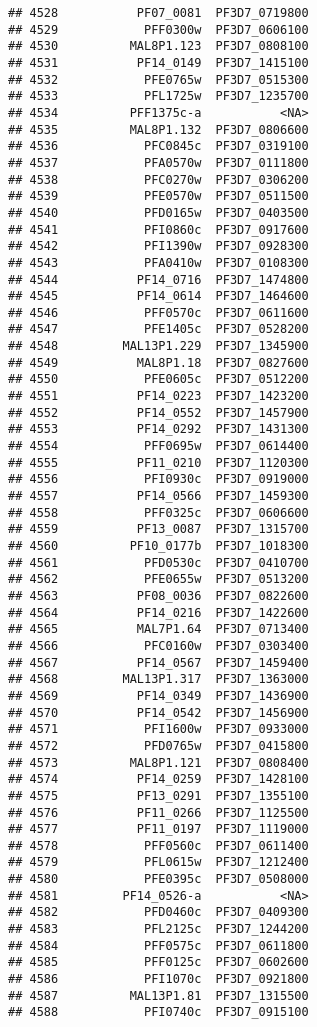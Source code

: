\documentclass{article}\usepackage[]{graphicx}\usepackage[]{color}
\makeatletter
\newenvironment{kframe}{%
 \def\at@end@of@kframe{}%
 \ifinner\ifhmode%
  \def\at@end@of@kframe{\end{minipage}}%
  \begin{minipage}{\columnwidth}%
 \fi\fi%
 \def\FrameCommand##1{\hskip\@totalleftmargin \hskip-\fboxsep
 \colorbox{shadecolor}{##1}\hskip-\fboxsep
     \hskip-\linewidth \hskip-\@totalleftmargin \hskip\columnwidth}%
 \MakeFramed {\advance\hsize-\width
   \@totalleftmargin\z@ \linewidth\hsize
   \@setminipage}}%
 {\par\unskip\endMakeFramed%
 \at@end@of@kframe}
\newenvironment{knitrout}{}{} %
\makeatother
\begin{document}
\begin{knitrout}
\begin{kframe}
\begin{verbatim}
## 4528           PF07_0081  PF3D7_0719800
## 4529            PFF0300w  PF3D7_0606100
## 4530          MAL8P1.123  PF3D7_0808100
## 4531           PF14_0149  PF3D7_1415100
## 4532            PFE0765w  PF3D7_0515300
## 4533            PFL1725w  PF3D7_1235700
## 4534          PFF1375c-a           <NA>
## 4535          MAL8P1.132  PF3D7_0806600
## 4536            PFC0845c  PF3D7_0319100
## 4537            PFA0570w  PF3D7_0111800
## 4538            PFC0270w  PF3D7_0306200
## 4539            PFE0570w  PF3D7_0511500
## 4540            PFD0165w  PF3D7_0403500
## 4541            PFI0860c  PF3D7_0917600
## 4542            PFI1390w  PF3D7_0928300
## 4543            PFA0410w  PF3D7_0108300
## 4544           PF14_0716  PF3D7_1474800
## 4545           PF14_0614  PF3D7_1464600
## 4546            PFF0570c  PF3D7_0611600
## 4547            PFE1405c  PF3D7_0528200
## 4548         MAL13P1.229  PF3D7_1345900
## 4549           MAL8P1.18  PF3D7_0827600
## 4550            PFE0605c  PF3D7_0512200
## 4551           PF14_0223  PF3D7_1423200
## 4552           PF14_0552  PF3D7_1457900
## 4553           PF14_0292  PF3D7_1431300
## 4554            PFF0695w  PF3D7_0614400
## 4555           PF11_0210  PF3D7_1120300
## 4556            PFI0930c  PF3D7_0919000
## 4557           PF14_0566  PF3D7_1459300
## 4558            PFF0325c  PF3D7_0606600
## 4559           PF13_0087  PF3D7_1315700
## 4560          PF10_0177b  PF3D7_1018300
## 4561            PFD0530c  PF3D7_0410700
## 4562            PFE0655w  PF3D7_0513200
## 4563           PF08_0036  PF3D7_0822600
## 4564           PF14_0216  PF3D7_1422600
## 4565           MAL7P1.64  PF3D7_0713400
## 4566            PFC0160w  PF3D7_0303400
## 4567           PF14_0567  PF3D7_1459400
## 4568         MAL13P1.317  PF3D7_1363000
## 4569           PF14_0349  PF3D7_1436900
## 4570           PF14_0542  PF3D7_1456900
## 4571            PFI1600w  PF3D7_0933000
## 4572            PFD0765w  PF3D7_0415800
## 4573          MAL8P1.121  PF3D7_0808400
## 4574           PF14_0259  PF3D7_1428100
## 4575           PF13_0291  PF3D7_1355100
## 4576           PF11_0266  PF3D7_1125500
## 4577           PF11_0197  PF3D7_1119000
## 4578            PFF0560c  PF3D7_0611400
## 4579            PFL0615w  PF3D7_1212400
## 4580            PFE0395c  PF3D7_0508000
## 4581         PF14_0526-a           <NA>
## 4582            PFD0460c  PF3D7_0409300
## 4583            PFL2125c  PF3D7_1244200
## 4584            PFF0575c  PF3D7_0611800
## 4585            PFF0125c  PF3D7_0602600
## 4586            PFI1070c  PF3D7_0921800
## 4587          MAL13P1.81  PF3D7_1315500
## 4588            PFI0740c  PF3D7_0915100

\end{verbatim}
\end{kframe}
\end{knitrout}
\end{document}
